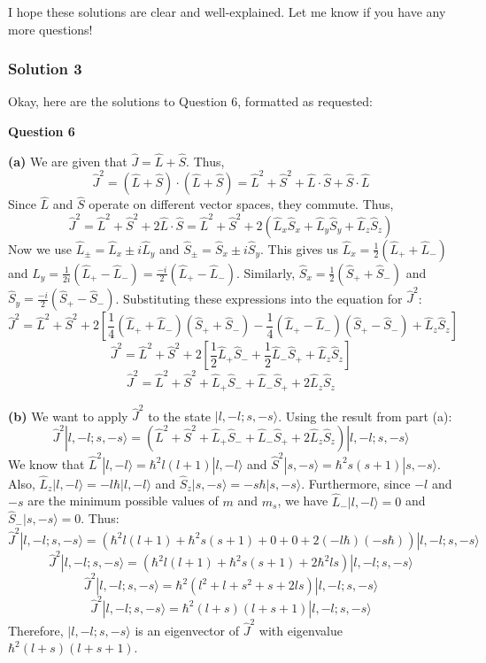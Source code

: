 \documentclass{article}
\begin{document}
I hope these solutions are clear and well-explained. Let me know if you have any more questions!

\subsubsection{Solution 3}
Okay, here are the solutions to Question 6, formatted as requested:

\textbf{Question 6}

\textbf{(a)} We are given that $\hat{J} = \hat{L} + \hat{S}$. Thus,
\[
\hat{J}^2 = (\hat{L} + \hat{S}) \cdot (\hat{L} + \hat{S}) = \hat{L}^2 + \hat{S}^2 + \hat{L} \cdot \hat{S} + \hat{S} \cdot \hat{L}
\]
Since $\hat{L}$ and $\hat{S}$ operate on different vector spaces, they commute. Thus,
\[
\hat{J}^2 = \hat{L}^2 + \hat{S}^2 + 2\hat{L} \cdot \hat{S} = \hat{L}^2 + \hat{S}^2 + 2(\hat{L}_x \hat{S}_x + \hat{L}_y \hat{S}_y + \hat{L}_z \hat{S}_z)
\]
Now we use $\hat{L}_\pm = \hat{L}_x \pm i \hat{L}_y$ and $\hat{S}_\pm = \hat{S}_x \pm i \hat{S}_y$. This gives us $\hat{L}_x = \frac{1}{2}(\hat{L}_+ + \hat{L}_-)$ and $\hat{L}_y = \frac{1}{2i}(\hat{L}_+ - \hat{L}_-) = \frac{-i}{2}(\hat{L}_+ - \hat{L}_-)$. Similarly, $\hat{S}_x = \frac{1}{2}(\hat{S}_+ + \hat{S}_-)$ and $\hat{S}_y = \frac{-i}{2}(\hat{S}_+ - \hat{S}_-)$. Substituting these expressions into the equation for $\hat{J}^2$:
\[
\hat{J}^2 = \hat{L}^2 + \hat{S}^2 + 2\left[ \frac{1}{4}(\hat{L}_+ + \hat{L}_-)(\hat{S}_+ + \hat{S}_-) - \frac{1}{4}(\hat{L}_+ - \hat{L}_-)(\hat{S}_+ - \hat{S}_-) + \hat{L}_z \hat{S}_z \right]
\]
\[
\hat{J}^2 = \hat{L}^2 + \hat{S}^2 + 2\left[ \frac{1}{2} \hat{L}_+ \hat{S}_- + \frac{1}{2} \hat{L}_- \hat{S}_+ + \hat{L}_z \hat{S}_z \right]
\]
\[
\hat{J}^2 = \hat{L}^2 + \hat{S}^2 + \hat{L}_+ \hat{S}_- + \hat{L}_- \hat{S}_+ + 2 \hat{L}_z \hat{S}_z
\]

\textbf{(b)} We want to apply $\hat{J}^2$ to the state $|l, -l; s, -s\rangle$. Using the result from part (a):
\[
\hat{J}^2 |l, -l; s, -s\rangle = (\hat{L}^2 + \hat{S}^2 + \hat{L}_+ \hat{S}_- + \hat{L}_- \hat{S}_+ + 2 \hat{L}_z \hat{S}_z) |l, -l; s, -s\rangle
\]
We know that $\hat{L}^2 |l, -l\rangle = \hbar^2 l(l+1) |l, -l\rangle$ and $\hat{S}^2 |s, -s\rangle = \hbar^2 s(s+1) |s, -s\rangle$. Also, $\hat{L}_z |l, -l\rangle = -l\hbar |l, -l\rangle$ and $\hat{S}_z |s, -s\rangle = -s\hbar |s, -s\rangle$.
Furthermore, since $-l$ and $-s$ are the minimum possible values of $m$ and $m_s$, we have $\hat{L}_- |l, -l\rangle = 0$ and $\hat{S}_- |s, -s\rangle = 0$. Thus:
\[
\hat{J}^2 |l, -l; s, -s\rangle = (\hbar^2 l(l+1) + \hbar^2 s(s+1) + 0 + 0 + 2(-l\hbar)(-s\hbar)) |l, -l; s, -s\rangle
\]
\[
\hat{J}^2 |l, -l; s, -s\rangle = (\hbar^2 l(l+1) + \hbar^2 s(s+1) + 2\hbar^2 ls) |l, -l; s, -s\rangle
\]
\[
\hat{J}^2 |l, -l; s, -s\rangle = \hbar^2 (l^2 + l + s^2 + s + 2ls) |l, -l; s, -s\rangle
\]
\[
\hat{J}^2 |l, -l; s, -s\rangle = \hbar^2 (l+s)(l+s+1) |l, -l; s, -s\rangle
\]
Therefore, $|l, -l; s, -s\rangle$ is an eigenvector of $\hat{J}^2$ with eigenvalue $\hbar^2 (l+s)(l+s+1)$.
\end{document}
